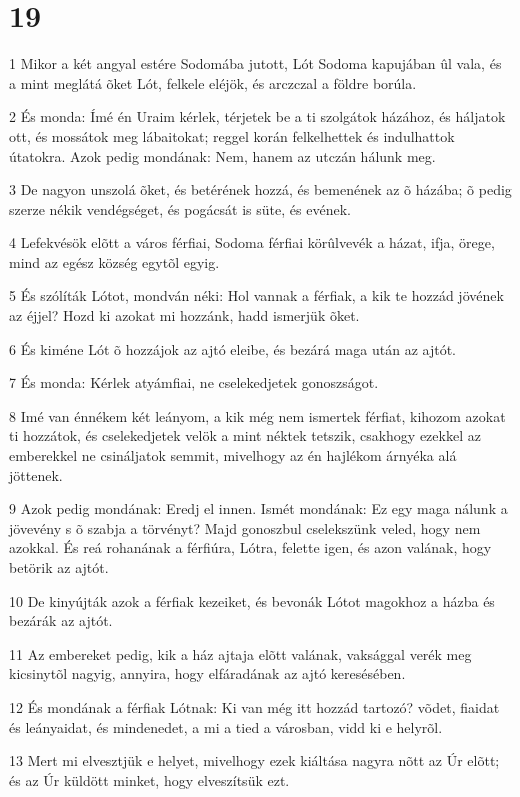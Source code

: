\chapter{19}

\par 1 Mikor a két angyal estére Sodomába jutott, Lót Sodoma kapujában ûl vala, és a mint meglátá õket Lót, felkele eléjök, és arczczal a földre borúla.
\par 2 És monda: Ímé én Uraim kérlek, térjetek be a ti szolgátok házához, és háljatok ott, és mossátok meg lábaitokat; reggel korán felkelhettek és indulhattok útatokra. Azok pedig mondának: Nem, hanem az utczán hálunk meg.
\par 3 De nagyon unszolá õket, és betérének hozzá, és bemenének az õ házába; õ pedig szerze nékik vendégséget, és pogácsát is süte, és evének.
\par 4 Lefekvésök elõtt a város férfiai, Sodoma férfiai körûlvevék a házat, ifja, örege, mind az egész község egytõl egyig.
\par 5 És szólíták Lótot, mondván néki: Hol vannak a férfiak, a kik te hozzád jövének az éjjel? Hozd ki azokat mi hozzánk, hadd ismerjük õket.
\par 6 És kiméne Lót õ hozzájok az ajtó eleibe, és bezárá maga után az ajtót.
\par 7 És monda: Kérlek atyámfiai, ne cselekedjetek gonoszságot.
\par 8 Imé van énnékem két leányom, a kik még nem ismertek férfiat, kihozom azokat ti hozzátok, és cselekedjetek velök a mint néktek tetszik, csakhogy ezekkel az emberekkel ne csináljatok semmit, mivelhogy az én hajlékom árnyéka alá jöttenek.
\par 9 Azok pedig mondának: Eredj el innen. Ismét mondának: Ez egy maga nálunk a jövevény s õ szabja a törvényt? Majd gonoszbul cselekszünk veled, hogy nem azokkal. És reá rohanának a férfiúra, Lótra, felette igen, és azon valának, hogy betörik az ajtót.
\par 10 De kinyújták azok a férfiak kezeiket, és bevonák Lótot magokhoz a házba és bezárák az ajtót.
\par 11 Az embereket pedig, kik a ház ajtaja elõtt valának, vaksággal verék meg kicsinytõl nagyig, annyira, hogy elfáradának az ajtó keresésében.
\par 12 És mondának a férfiak Lótnak: Ki van még itt hozzád tartozó? võdet, fiaidat és leányaidat, és mindenedet, a mi a tied a városban, vidd ki e helyrõl.
\par 13 Mert mi elvesztjük e helyet, mivelhogy ezek kiáltása nagyra nõtt az Úr elõtt; és az Úr küldött minket, hogy elveszítsük ezt.
